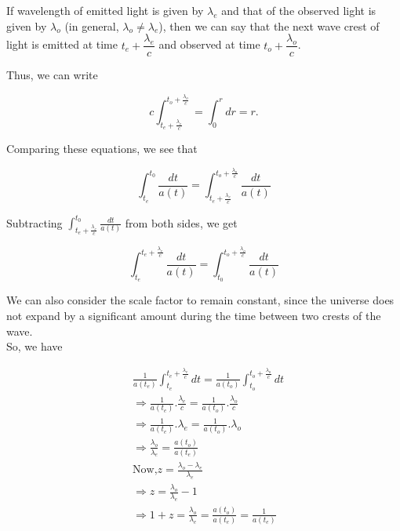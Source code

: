 \documentclass[a4,12pt,oneside]{report}
\begin{document}
	If wavelength of emitted light is given by $ \lambda_e $ and that of the observed light is given by $ \lambda_o $ (in general, $ \lambda_o \neq \lambda_e $), then we can say that the next wave crest of light is emitted at time $ t_e+\dfrac{\lambda_e}{c} $ and observed at time $ t_o + \dfrac{\lambda_o}{c} $.
	
	Thus, we can write
	
	\begin{equation}	
		c\int_{t_e+\frac{\lambda_e}{c}}^{t_o+\frac{\lambda_o}{c}}= \int_0^r dr = r.
	\end{equation}
	
	Comparing these equations, we see that
	
	\begin{equation}
		\int_{t_e}^{t_0} \frac{dt}{a(t)} = \int_{t_e+\frac{\lambda_e}{c}}^{t_o+\frac{\lambda_o}{c}} \frac{dt}{a(t)}
	\end{equation}
	
	Subtracting $ \int_{t_e+\frac{\lambda_e}{c}}^{t_0} \frac{dt}{a(t)} $ from both sides, we get
	
	\begin{equation}
		\int_{t_e}^{t_e+\frac{\lambda_e}{c}} \frac{dt}{a(t)} = \int_{t_0}^{t_o+\frac{\lambda_o}{c}} \frac{dt}{a(t)}
	\end{equation}
	
	We can also consider the scale factor to remain constant, since the universe does not expand by a significant amount during the time between two crests of the wave. \\
	
	So, we have
	
	\begin{align}
		&\frac{1}{a(t_e)}\int_{t_e}^{t_e+\frac{\lambda_e}{c}} dt = \frac{1}{a(t_o)}\int_{t_o}^{t_o+\frac{\lambda_o}{c}} dt	
		\\
		&\Rightarrow \frac{1}{a(t_e)}.\frac{\lambda_e}{c} =\frac{1}{a(t_o)}.\frac{\lambda_o}{c}
		\\
		&\Rightarrow \frac{1}{a(t_e)}.\lambda_e = \frac{1}{a(t_o)}.\lambda_o
		\\
		&\Rightarrow \frac{\lambda_o}{\lambda_e} = \frac{a(t_o)}{a(t_e)}
		\\
		&\text{Now,} z=\frac{\lambda_o-\lambda_e}{\lambda_e} \\
		&\Rightarrow z=\frac{\lambda_o}{\lambda_e}-1 \\
		&\Rightarrow 1+z = \frac{\lambda_o}{\lambda_e} = \frac{a(t_o)}{a(t_e)} = \frac{1}{a(t_e)}
	\end{align}
	
\end{document}
